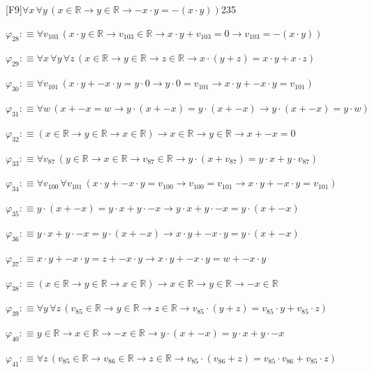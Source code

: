 \begin{fullproof}{[F9]}{$\forall x\,\forall y\,(x \in \mathbb{R} \to y \in \mathbb{R} \to -x \cdot y = -(x \cdot y))$}{235}
\begin{abbrevlist}
\item $\varphi_{28} :\equiv \forall v_{103}\,(x \cdot y \in \mathbb{R} \to v_{103} \in \mathbb{R} \to x \cdot y + v_{103} = 0 \to v_{103} = -(x \cdot y))$
\item $\varphi_{29} :\equiv \forall x\,\forall y\,\forall z\,(x \in \mathbb{R} \to y \in \mathbb{R} \to z \in \mathbb{R} \to x \cdot (y + z) = x \cdot y + x \cdot z)$
\item $\varphi_{30} :\equiv \forall v_{101}\,(x \cdot y + -x \cdot y = y \cdot 0 \to y \cdot 0 = v_{101} \to x \cdot y + -x \cdot y = v_{101})$
\item $\varphi_{31} :\equiv \forall w\,(x + -x = w \to y \cdot (x + -x) = y \cdot (x + -x) \to y \cdot (x + -x) = y \cdot w)$
\item $\varphi_{32} :\equiv (x \in \mathbb{R} \to y \in \mathbb{R} \to x \in \mathbb{R}) \to x \in \mathbb{R} \to y \in \mathbb{R} \to x + -x = 0$
\item $\varphi_{33} :\equiv \forall v_{87}\,(y \in \mathbb{R} \to x \in \mathbb{R} \to v_{87} \in \mathbb{R} \to y \cdot (x + v_{87}) = y \cdot x + y \cdot v_{87})$
\item $\varphi_{34} :\equiv \forall v_{100}\,\forall v_{101}\,(x \cdot y + -x \cdot y = v_{100} \to v_{100} = v_{101} \to x \cdot y + -x \cdot y = v_{101})$
\item $\varphi_{35} :\equiv y \cdot (x + -x) = y \cdot x + y \cdot -x \to y \cdot x + y \cdot -x = y \cdot (x + -x)$
\item $\varphi_{36} :\equiv y \cdot x + y \cdot -x = y \cdot (x + -x) \to x \cdot y + -x \cdot y = y \cdot (x + -x)$
\item $\varphi_{37} :\equiv x \cdot y + -x \cdot y = z + -x \cdot y \to x \cdot y + -x \cdot y = w + -x \cdot y$
\item $\varphi_{38} :\equiv (x \in \mathbb{R} \to y \in \mathbb{R} \to x \in \mathbb{R}) \to x \in \mathbb{R} \to y \in \mathbb{R} \to -x \in \mathbb{R}$
\item $\varphi_{39} :\equiv \forall y\,\forall z\,(v_{85} \in \mathbb{R} \to y \in \mathbb{R} \to z \in \mathbb{R} \to v_{85} \cdot (y + z) = v_{85} \cdot y + v_{85} \cdot z)$
\item $\varphi_{40} :\equiv y \in \mathbb{R} \to x \in \mathbb{R} \to -x \in \mathbb{R} \to y \cdot (x + -x) = y \cdot x + y \cdot -x$
\item $\varphi_{41} :\equiv \forall z\,(v_{85} \in \mathbb{R} \to v_{86} \in \mathbb{R} \to z \in \mathbb{R} \to v_{85} \cdot (v_{86} + z) = v_{85} \cdot v_{86} + v_{85} \cdot z)$

\end{abbrevlist}
\end{fullproof}
